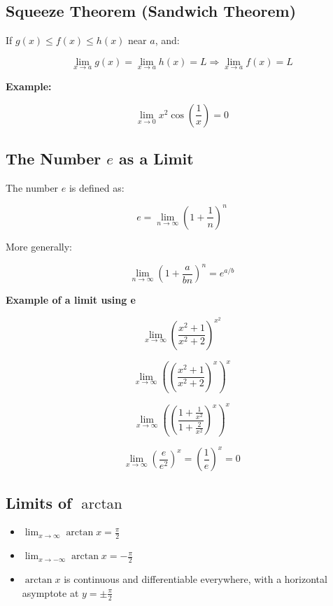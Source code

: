 \subsection{Squeeze Theorem (Sandwich Theorem)}

If \(g(x) \le f(x) \le h(x)\) near \(a\), and:

\[
    \lim_{x \to a} g(x) = \lim_{x \to a} h(x) = L
    \Rightarrow \lim_{x \to a} f(x) = L
\]

\textbf{Example:}

\[
    \lim_{x \to 0} x^2 \cos\left( \frac{1}{x} \right) = 0
\]

\subsection{The Number \texorpdfstring{\(e\)}{e} as a Limit}

The number \(e\) is defined as:

\[
    e = \lim_{n \to \infty} {\left(1 + \frac{1}{n} \right)}^n
\]

More generally:

\[
    \lim_{n \to \infty} {\left(1 + \frac{a}{bn} \right)}^n = e^{a/b}
\]

\textbf{Example of a limit using e}

\[
    \lim_{x \to \infty}{\left(\frac{x^2 + 1}{x^2 +2}\right)}^{x^2}
\]

\[
    \lim_{x \to \infty} {\left({\left(\frac{x^2 + 1}{x^2 +2}\right)}^{x}\right)}^x
\]

\[
    \lim_{x \to \infty} {\left({\left(\frac{1 + \frac{1}{x^2}}{1 + \frac{2}{x^2}}\right)}^{x}\right)}^x
\]

\[
    \lim_{x \to \infty} {\left(\frac{e}{e^2}\right)}^x = {\left(\frac{1}{e}\right)}^x = 0
\]

\subsection{Limits of \texorpdfstring{\(\arctan\)}{arctan}}

\begin{itemize}

    \item \(\lim_{x \to \infty} \arctan x = \frac{\pi}{2}\)

    \item \(\lim_{x \to -\infty} \arctan x = -\frac{\pi}{2}\)

    \item \(\arctan x\) is continuous and differentiable everywhere, with a horizontal asymptote at 
    \(y = \pm \frac{\pi}{2}\)

\end{itemize}

